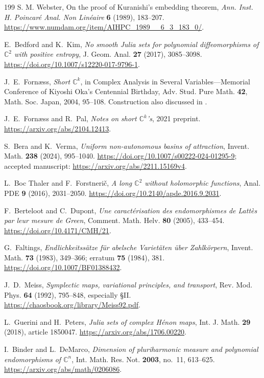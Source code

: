 \documentclass[11pt,reqno]{amsart}
\theoremstyle{definition}
\theoremstyle{remark}
\begin{document}
\begin{thebibliography}{199}
 S. M. Webster, On the proof of Kuranishi's embedding theorem, \emph{Ann. Inst. H. Poincar\'e Anal. Non Lin\'eaire} \textbf{6} (1989), 183--207. \url{https://www.numdam.org/item/AIHPC_1989__6_3_183_0/}.

 E.~Bedford and K.~Kim, \emph{No smooth Julia sets for polynomial diffeomorphisms of $\mathbb C^2$ with positive entropy}, J. Geom. Anal. \textbf{27} (2017), 3085--3098. \url{https://doi.org/10.1007/s12220-017-9796-1}.

 J.~E.~Forn\ae ss, \emph{Short $\mathbb C^k$}, in Complex Analysis in Several Variables---Memorial Conference of Kiyoshi Oka's Centennial Birthday, Adv. Stud. Pure Math. \textbf{42}, Math. Soc. Japan, 2004, 95--108. Construction also discussed in \cite{FS-ShortNotes}.

 J.~E.~Forn\ae ss and R.~Pal, \emph{Notes on short $\mathbb C^k$'s}, 2021 preprint. \url{https://arxiv.org/abs/2104.12413}.

 S.~Bera and K.~Verma, \emph{Uniform non-autonomous basins of attraction}, Invent. Math. \textbf{238} (2024), 995--1040. \url{https://doi.org/10.1007/s00222-024-01295-9}; accepted manuscript: \url{https://arxiv.org/abs/2211.15169v4}.

 L.~Boc Thaler and F.~Forstneri\v c, \emph{A long $\mathbb C^2$ without holomorphic functions}, Anal. PDE \textbf{9} (2016), 2031--2050. \url{https://doi.org/10.2140/apde.2016.9.2031}.

 F.~Berteloot and C.~Dupont, \emph{Une caract\'erisation des endomorphismes de Latt\`es par leur mesure de Green}, Comment. Math. Helv. \textbf{80} (2005), 433--454. \url{https://doi.org/10.4171/CMH/21}.

 G.~Faltings, \emph{Endlichkeitss\"atze f\"ur abelsche Variet\"aten \"uber Zahlk\"orpern}, Invent. Math. \textbf{73} (1983), 349--366; erratum \textbf{75} (1984), 381. \url{https://doi.org/10.1007/BF01388432}.

 J.~D.~Meiss, \emph{Symplectic maps, variational principles, and transport}, Rev. Mod. Phys. \textbf{64} (1992), 795--848, especially \S II. \url{https://chaosbook.org/library/Meiss92.pdf}.

 L.~Guerini and H.~Peters, \emph{Julia sets of complex H\'enon maps}, Int. J. Math. \textbf{29} (2018), article 1850047. \url{https://arxiv.org/abs/1706.00220}.

 I.~Binder and L.~DeMarco, \emph{Dimension of pluriharmonic measure and polynomial endomorphisms of $\mathbb C^n$}, Int. Math. Res. Not. \textbf{2003}, no.~11, 613--625. \url{https://arxiv.org/abs/math/0206086}.


\end{thebibliography}
\end{document}

